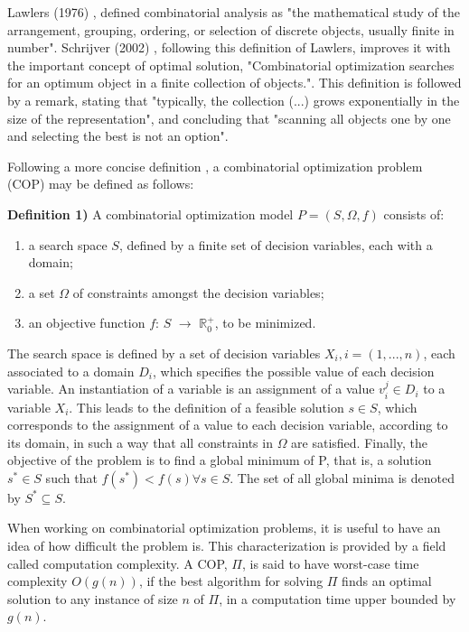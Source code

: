 
Lawlers (1976) \cite{COP_book_lawler}, defined combinatorial analysis as "the mathematical study of the arrangement, grouping, ordering, or selection of discrete objects, usually finite in number". Schrijver (2002) \cite{COP_book}, following this definition of Lawlers, improves it with the important concept of optimal solution, "Combinatorial optimization searches for an optimum object in a finite collection of objects.". This definition is followed by a remark, stating that "typically, the collection (...) grows exponentially in the size of the representation", and concluding that "scanning all objects one by one and selecting the best is not an option".

Following a more concise definition \cite{aco_overview_advances}, a combinatorial optimization problem (COP) may be defined as follows:

\textbf{Definition 1)}  A combinatorial optimization model $P = (S,\Omega, f)$ consists of:
\begin{enumerate}
  \item a search space $S$, defined by a finite set of decision variables, each with a domain;
  \item a set $\Omega$ of constraints amongst the decision variables;
  \item an objective function $f$: $S$ $\rightarrow$ $\mathbb{R}_{0}^{+}$, to be minimized.
\end{enumerate}

The search space is defined by a set of decision variables $X_{i}, i = (1,...,n)$, each associated to a domain $D_{i}$, which specifies the possible value of each decision variable. An instantiation of a variable is an assignment of a value $v_{i}^{j} \in D_{i}$ to a variable $X_{i}$. This leads to the definition of a feasible solution $s \in S$, which corresponds to the assignment of a value to each decision variable, according to its domain, in such a way that all constraints in $\Omega$ are satisfied. Finally, the objective of the problem is to find a global minimum of P, that is, a solution $s^{*} \in S$ such that $f(s^{*}) < f(s) \forall s \in S$. The set of all global minima is denoted by $S^{*} \subseteq S$.

When working on combinatorial optimization problems, it is useful to have an idea of how difficult the problem is. This characterization is provided by a field called computation complexity. A COP, $\Pi$, is said to have worst-case time complexity  $O(g(n))$, if the best algorithm 
for solving $\Pi$ finds an optimal solution to any instance of size $n$ of $\Pi$,
in a computation time upper bounded by $g(n)$.

